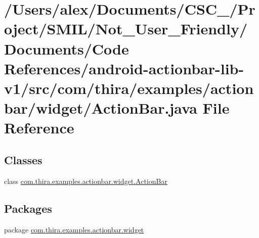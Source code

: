 \hypertarget{_documents_2_code_01_references_2android-actionbar-lib-v1_2src_2com_2thira_2examples_2actionbar_2widget_2_action_bar_8java}{\section{/\-Users/alex/\-Documents/\-C\-S\-C\-\_/\-Project/\-S\-M\-I\-L/\-Not\-\_\-\-User\-\_\-\-Friendly/\-Documents/\-Code References/android-\/actionbar-\/lib-\/v1/src/com/thira/examples/actionbar/widget/\-Action\-Bar.java File Reference}
\label{_documents_2_code_01_references_2android-actionbar-lib-v1_2src_2com_2thira_2examples_2actionbar_2widget_2_action_bar_8java}
}
\subsection*{Classes}
\begin{DoxyCompactItemize}
\item 
class \hyperlink{classcom_1_1thira_1_1examples_1_1actionbar_1_1widget_1_1_action_bar}{com.\-thira.\-examples.\-actionbar.\-widget.\-Action\-Bar}
\end{DoxyCompactItemize}
\subsection*{Packages}
\begin{DoxyCompactItemize}
\item 
package \hyperlink{namespacecom_1_1thira_1_1examples_1_1actionbar_1_1widget}{com.\-thira.\-examples.\-actionbar.\-widget}
\end{DoxyCompactItemize}
